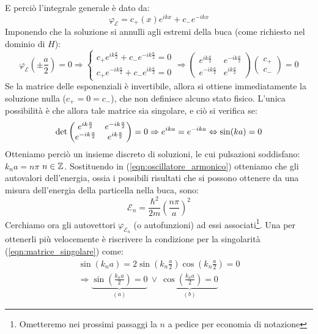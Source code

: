 \documentclass[../../FisicaTeorica.tex]{subfiles}
\begin{document}
E perciò l'integrale generale è dato da:
\[
\varphi_\mathcal{E}=c_+(x) e^{ikx}+c_- e^{-ikx}
\]
Imponendo che la soluzione si annulli agli estremi della buca (come richiesto nel dominio di $H$):
\begin{equation}
\varphi_\mathcal{E}\left(\pm\frac{a}{2}\right)=0\Rightarrow
\begin{cases}
c_+ e^{ik\frac{a}{2}}+c_- e^{-ik\frac{a}{2}}=0\\
c_+ e^{-ik\frac{a}{2}} + c_- e^{ik\frac{a}{2}} = 0
\end{cases}
\Rightarrow 
\begin{pmatrix}
e^{ik\frac{a}{2}} & e^{-ik\frac{a}{2}}\\
e^{-ik\frac{a}{2}} & e^{ik\frac{a}{2}}
\end{pmatrix}
\begin{pmatrix}
c_+\\
c_-
\end{pmatrix} = 0
\label{eqn:condizioni_contorno_buca}
\end{equation}
Se la matrice delle esponenziali è invertibile, allora si ottiene immediatamente la soluzione nulla ($c_+=0=c_-$), che non definisce alcuno stato fisico. L'unica possibilità è che allora tale matrice sia singolare, e ciò si verifica se:
\begin{equation}
\operatorname{det}\begin{pmatrix}
e^{ik\frac{a}{2}} & e^{-ik\frac{a}{2}}\\
e^{-ik\frac{a}{2}} & e^{ik\frac{a}{2}}
\end{pmatrix}
 = 0 \Rightarrow e^{ika} = e^{-ika}\Leftrightarrow \sin(ka)=0
\label{eqn:matrice_singolare}
\end{equation}
Otteniamo perciò un insieme discreto di soluzioni, le cui pulsazioni soddisfano: $k_n a = n\pi$ $n\in \mathbb{Z}$. Sostituendo in (\ref{eqn:oscillatore_armonico}) otteniamo che gli autovalori dell'energia, ossia i possibili risultati che si possono ottenere da una misura dell'energia della particella nella buca, sono:
\begin{equation}
    \mathcal{E}_n = \frac{\hbar^2}{2m}\left(\frac{n\pi}{a}\right)^2
    \label{eqn:autovalori_buca}
\end{equation}
Cerchiamo ora gli autovettori $\varphi_{\mathcal{E}_n}$ (o autofunzioni) ad essi associati\footnote{Ometteremo nei prossimi passaggi la $n$ a pedice per economia di notazione}. Una  per ottenerli più velocemente è riscrivere la condizione per la singolarità (\ref{eqn:matrice_singolare}) come:
\begin{align*}
\sin(k_n a) = 2\sin\left (k_n\frac{a}{2}\right )\cos\left (k_n \frac{a}{2}\right)=0 \\ \Rightarrow 
\underbrace{\sin\left(\frac{k_n a}{2}\right) = 0}_{(a)}\>\lor\>
\underbrace{\cos\left(\frac{k_n a}{2}\right) = 0}_{(b)}
\end{align*}
\end{document}

